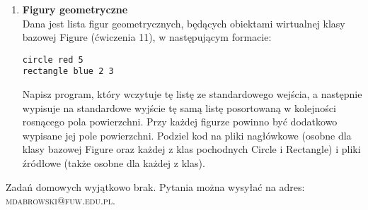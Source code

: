 \documentclass[12pt]{article}
\begin{document}
\begin{enumerate}
\item \textbf{Figury geometryczne}\\
Dana jest lista figur geometrycznych, będących obiektami wirtualnej klasy bazowej \textsf{Figure} (ćwiczenia 11), w następującym formacie:
\begin{verbatim}
circle red 5
rectangle blue 2 3
\end{verbatim}

Napisz program, który wczytuje tę listę ze standardowego wejścia, a następnie wypisuje na standardowe wyjście tę samą listę posortowaną w kolejności rosnącego pola powierzchni. Przy każdej figurze powinno być dodatkowo wypisane jej pole powierzchni. Podziel kod na pliki nagłówkowe (osobne dla klasy bazowej \textsf{Figure} oraz każdej z klas pochodnych \textsf{Circle} i \textsf{Rectangle}) i pliki źródłowe (także osobne dla każdej z klas).
\end{enumerate}
\vspace{1cm}
\small Zadań domowych wyjątkowo brak. Pytania można wysyłać na adres: \textsc{mdabrowski@fuw.edu.pl}.
\end{document}
